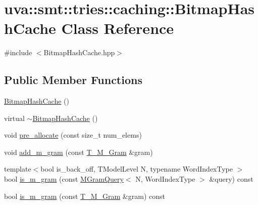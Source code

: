 \hypertarget{classuva_1_1smt_1_1tries_1_1caching_1_1_bitmap_hash_cache}{}\section{uva\+:\+:smt\+:\+:tries\+:\+:caching\+:\+:Bitmap\+Hash\+Cache Class Reference}
\label{classuva_1_1smt_1_1tries_1_1caching_1_1_bitmap_hash_cache}


{\ttfamily \#include $<$Bitmap\+Hash\+Cache.\+hpp$>$}

\subsection*{Public Member Functions}
\begin{DoxyCompactItemize}
\item 
\hyperlink{classuva_1_1smt_1_1tries_1_1caching_1_1_bitmap_hash_cache_a4d8b5eafc27e5270795505c9018e5228}{Bitmap\+Hash\+Cache} ()
\item 
virtual \hyperlink{classuva_1_1smt_1_1tries_1_1caching_1_1_bitmap_hash_cache_ad69c96b30c7a4448a51df194c43b8683}{$\sim$\+Bitmap\+Hash\+Cache} ()
\item 
void \hyperlink{classuva_1_1smt_1_1tries_1_1caching_1_1_bitmap_hash_cache_ad96d49d81dd292e1e6d50bb04e69f9e6}{pre\+\_\+allocate} (const size\+\_\+t num\+\_\+elems)
\item 
void \hyperlink{classuva_1_1smt_1_1tries_1_1caching_1_1_bitmap_hash_cache_ad43df9158968907e1dcadd206df4d7b9}{add\+\_\+m\+\_\+gram} (const \hyperlink{structuva_1_1smt_1_1tries_1_1mgrams_1_1_t___m___gram}{T\+\_\+\+M\+\_\+\+Gram} \&gram)
\item 
{\footnotesize template$<$bool is\+\_\+back\+\_\+off, T\+Model\+Level N, typename Word\+Index\+Type $>$ }\\bool \hyperlink{classuva_1_1smt_1_1tries_1_1caching_1_1_bitmap_hash_cache_aff88e85e58d3a2681d43f0fa2d986041}{is\+\_\+m\+\_\+gram} (const \hyperlink{structuva_1_1smt_1_1tries_1_1_m_gram_query}{M\+Gram\+Query}$<$ N, Word\+Index\+Type $>$ \&query) const 
\item 
bool \hyperlink{classuva_1_1smt_1_1tries_1_1caching_1_1_bitmap_hash_cache_ac81e446a163384c848f3409029e17342}{is\+\_\+m\+\_\+gram} (const \hyperlink{structuva_1_1smt_1_1tries_1_1mgrams_1_1_t___m___gram}{T\+\_\+\+M\+\_\+\+Gram} \&gram) const 
\end{DoxyCompactItemize}


